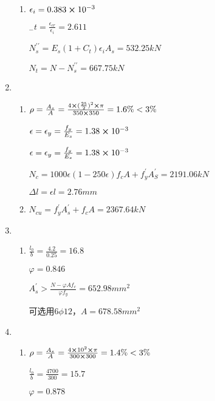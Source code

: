 \documentclass{article}
\begin{document}
\begin{questionList}
\begin{enumerate}
\begin{enumerate}
                        \item $\epsilon_i=0.383\cross10^{-3}$
                              \par $_-t=\frac{\epsilon_{cr}}{\epsilon_i}=2.611$
                              \par $N_s^{\prime\prime}=E_s(1+C_t)\epsilon_iA_s=532.25kN$
                              \par $N_t=N-N_s^{\prime\prime}=667.75kN$
                  \end{enumerate}
            \item \begin{enumerate}
                        \item $\rho=\frac{A_s}{A}=\frac{4\cross(\frac{25}{2})^2\cross\pi}{350\cross350}=1.6\%<3\%$
                              \par $\epsilon=\epsilon_y=\frac{f_y}{E_s}=1.38\cross10^{-3}$
                              \par $\epsilon=\epsilon_y=\frac{f_y}{E_s}=1.38\cross10^{-3}$
                              \par $N_c=1000\epsilon(1-250\epsilon)f_cA+f_y^{\prime}A_S^{\prime}=2191.06kN$
                              \par $\Delta l=\epsilon l=2.76mm$
                        \item $N_{cu}=f_y^{\prime}A_s^{\prime}+f_cA=2367.64kN$
                  \end{enumerate}
            \item \begin{enumerate}
                        \item $\frac{l_0}{b}=\frac{4.2}{0.25}=16.8$
                              \par $\varphi=0.846$
                              \par $A_s^{\prime}>\frac{N-\varphi A f_c}{\varphi f_y}=652.98mm^2$
                              \par 可选用$6\phi12$，$A=678.58mm^2$
                  \end{enumerate}
            \item \begin{enumerate}
                        \item $\rho=\frac{A_s}{A}=\frac{4\cross10^2\cross\pi}{300\cross300}=1.4\%<3\%$
                              \par $\frac{l_0}{b}=\frac{4700}{300}=15.7$
                              \par $\varphi=0.878$

\end{enumerate}
\end{enumerate}
\end{questionList}
\end{document}
